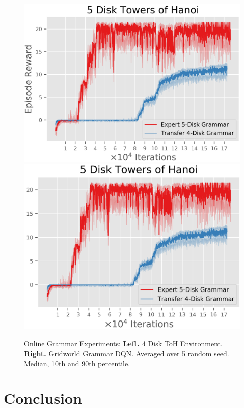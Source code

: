\documentclass[10pt,letterpaper]{article}
\begin{document}
\begin{figure}[H]
  \includegraphics[width=\linewidth]{figures/hanoi_5_learning_curve}
\endminipage\hfill
{}
  \includegraphics[width=\linewidth]{figures/hanoi_6_learning_curve}
\endminipage\hfill
\caption{Online Grammar Experiments: \textbf{Left.} 4 Disk ToH Environment. \textbf{Right.} Gridworld Grammar DQN. Averaged over 5 random seed. Median, 10th and 90th percentile.}
\label{fig:online_grammar}
\end{figure}


\section{Conclusion}
\end{document}
